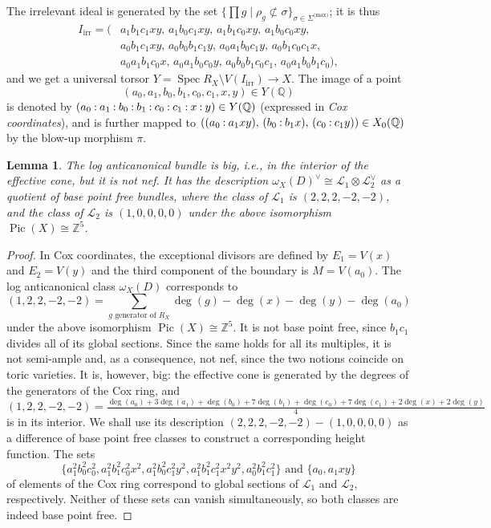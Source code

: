 \documentclass[a4paper, twoside, 10pt]{amsart}
\newcommand{\pc}[1]{%
  \begingroup\lccode`~=`: \lowercase{\endgroup
  \edef~}{\mathbin{\mathchar\the\mathcode`:}\nobreak}%
  (%
  \begingroup
  \mathcode`:=\string"8000
  #1%
  \endgroup
  )%
}
\newcommand{\cL}{\mathcal{L}}
\newcommand{\ZZ}{\mathbb{Z}}
\newcommand{\QQ}{\mathbb{Q}}
\DeclareMathOperator{\Pic}{Pic}
\DeclareMathOperator{\Spec}{Spec}
\newcommand{\irr}{\mathrm{irr}}
\newtheorem{lemma}[theorem]{Lemma}
\theoremstyle{definition}
\begin{document}
The irrelevant ideal is generated by the set $\{\prod g \mid \rho_g \not\subset \sigma\}_{\sigma\in\Sigma^{\text{(max)}}}$; it is thus
\begin{align*}
  I_\irr=(
  &a_1b_1c_1xy,\,
  a_1b_0c_1xy,\,
  a_1b_1c_0xy,\,
  a_1b_0c_0xy,\\
  &a_0b_1c_1xy,\,
  a_0b_0b_1c_1y,\,
  a_0a_1b_0c_1y,\,
  a_0b_1c_0c_1x,\\
  &a_0a_1b_1c_0x,\,
  a_0a_1b_0c_0y,\,
  a_0b_0b_1c_0c_1,\,
  a_0a_1b_0b_1c_0
  ),
\end{align*}
and we get a universal torsor $Y=\Spec R_X \setminus V(I_\irr) \to X$. 
The image of a point 
\[
  (a_0,a_1,b_0,b_1,c_0,c_1,x,y)\in Y(\QQ)
\]
is denoted by $\pc{a_0:a_1:b_0:b_1:c_0:c_1:x:y}\in Y(\QQ)$ (expressed in \emph{Cox coordinates}), and is further mapped to $(\pc{a_0:a_1xy},\, \pc{b_0:b_1x},\, \pc{c_0:c_1y})\in X_0(\QQ)$ by the blow-up morphism $\pi$.

\begin{lemma}\label{lem:description-as-difference}
  The log anticanonical bundle is big, i.e., in the interior of the effective cone, but it is not nef. It has the description $\omega_X(D)^\vee\cong \cL_1 \otimes \cL_2^\vee$ as a quotient of base point free bundles, where the class of $\cL_1$ is $(2,2,2,-2,-2)$, and the class of $\cL_2$ is $(1,0,0,0,0)$ under the above isomorphism $\Pic(X)\cong\ZZ^5$.
\end{lemma}
\begin{proof}
  In Cox coordinates, the exceptional divisors are defined by $E_1=V(x)$ and $E_2=V(y)$ and the third component of the boundary is $M=V(a_0)$.
  The log anticanonical class $\omega_X(D)$ corresponds to
  \[
    (1,2,2,-2,-2)=\sum_{g\text{ generator of } R_X} \deg(g) - \deg(x)-\deg(y)-\deg(a_0)
  \]
  under the above isomorphism $\Pic(X)\cong\ZZ^5$.
  It is not base point free, since $b_1c_1$ divides all of its global sections. Since the same holds for all its multiples, it is not semi-ample and, as a consequence, not nef, since the two notions coincide on toric varieties. It is, however, big: the effective cone is generated by the degrees of the generators of the Cox ring, and 
  \begin{equation*}
    (1,2,2,-2,-2) = \tfrac{\deg(a_0) + 3 \deg(a_1) + \deg(b_0) + 7\deg(b_1) + \deg(c_0) + 7\deg(c_1) + 2\deg(x) + 2\deg(y)}{4}
  \end{equation*}
  is in its interior. We shall use its description $(2,2,2,-2,-2)-(1,0,0,0,0)$ as a difference of base point free classes to construct a corresponding height function. The sets
  \begin{equation}\label{eq:sections}
  \{a_1^2b_0^2c_0^2,
    a_1^2b_1^2c_0^2x^2,
    a_1^2b_0^2c_1^2y^2,
    a_1^2b_1^2c_1^2x^2y^2,
    a_0^2b_1^2c_1^2
  \} \text { and } \{
    a_0, a_1xy
  \}
  \end{equation}
  of elements of the Cox ring correspond to global sections of $\cL_1$ and $\cL_2$, respectively. Neither of these sets can vanish simultaneously, so both classes are indeed base point free.
\end{proof}
\end{document}

